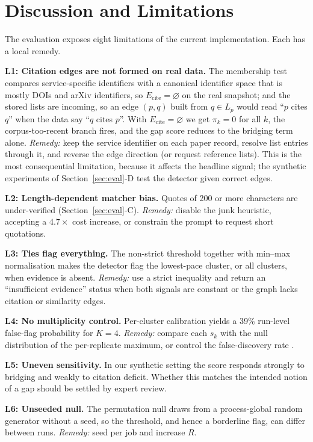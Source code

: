 \documentclass[conference]{IEEEtran}
\begin{document}
\section{Discussion and Limitations}
\label{sec:disc}
The evaluation exposes eight limitations of the current implementation. Each has a local remedy.

\textbf{L1: Citation edges are not formed on real data.} The membership test compares service-specific identifiers with a canonical identifier space that is mostly DOIs and arXiv identifiers, so $E_{\mathrm{cite}}=\varnothing$ on the real snapshot; and the stored lists are incoming, so an edge $(p,q)$ built from $q\in L_p$ would read ``$p$ cites $q$'' when the data say ``$q$ cites $p$''. With $E_{\mathrm{cite}}=\varnothing$ we get $\pi_k=0$ for all $k$, the corpus-too-recent branch fires, and the gap score reduces to the bridging term alone. \emph{Remedy:} keep the service identifier on each paper record, resolve list entries through it, and reverse the edge direction (or request reference lists). This is the most consequential limitation, because it affects the headline signal; the synthetic experiments of Section~\ref{sec:eval}-D test the detector given correct edges.

\textbf{L2: Length-dependent matcher bias.} Quotes of 200 or more characters are under-verified (Section~\ref{sec:eval}-C). \emph{Remedy:} disable the junk heuristic, accepting a $4.7\times$ cost increase, or constrain the prompt to request short quotations.

\textbf{L3: Ties flag everything.} The non-strict threshold together with min--max normalisation makes the detector flag the lowest-pace cluster, or all clusters, when evidence is absent. \emph{Remedy:} use a strict inequality and return an ``insufficient evidence'' status when both signals are constant or the graph lacks citation or similarity edges.

\textbf{L4: No multiplicity control.} Per-cluster calibration yields a 39\% run-level false-flag probability for $K=4$. \emph{Remedy:} compare each $s_k$ with the null distribution of the per-replicate maximum, or control the false-discovery rate \cite{benjamini1995fdr}.

\textbf{L5: Uneven sensitivity.} In our synthetic setting the score responds strongly to bridging and weakly to citation deficit. Whether this matches the intended notion of a gap should be settled by expert review.

\textbf{L6: Unseeded null.} The permutation null draws from a process-global random generator without a seed, so the threshold, and hence a borderline flag, can differ between runs. \emph{Remedy:} seed per job and increase $R$.
\end{document}
